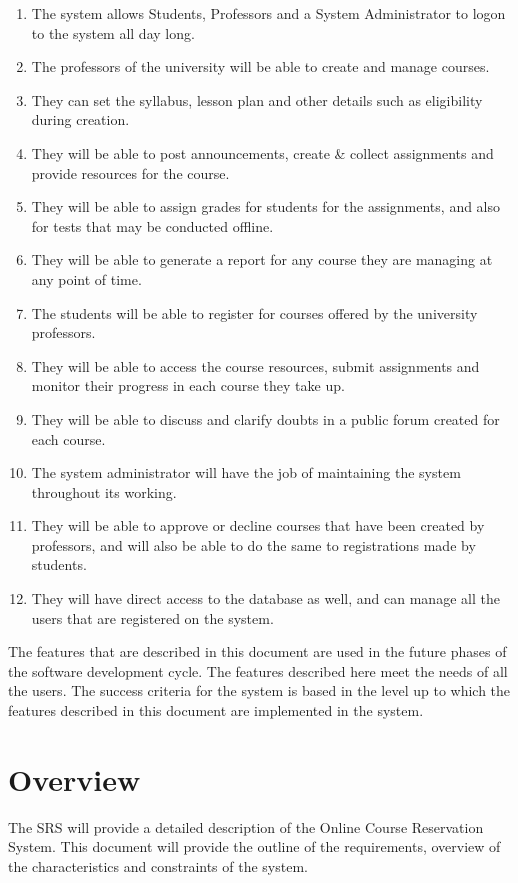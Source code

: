 \documentclass[12pt, a4]{report}
\begin{document}
\begin{enumerate}
    \item The system allows Students, Professors and a System Administrator to logon to the system all day long.
    \item The professors of the university will be able to create and manage courses.
    \item They can set the syllabus, lesson plan and other details such as eligibility during creation.
    \item They will be able to post announcements, create \& collect assignments and provide resources for the course.
    \item They will be able to assign grades for students for the assignments, and also for tests that may be conducted offline.
    \item They will be able to generate a report for any course they are managing at any point of time.
    \item The students will be able to register for courses offered by the university professors.
    \item They will be able to access the course resources, submit assignments and monitor their progress in each course they take up.
    \item They will be able to discuss and clarify doubts in a public forum created for each course.
    \item The system administrator will have the job of maintaining the system throughout its working.
    \item They will be able to approve or decline courses that have been created by professors, and will also be able to do the same to registrations made by students.
    \item They will have direct access to the database as well, and can manage all the users that are registered on the system.
\end{enumerate}

The features that are described in this document are used in the future phases of the software development cycle. The features described here meet the needs of all the users. The success criteria for the system is based in the level up to which the features described in this document are implemented in the system.


\section{Overview}
The SRS will provide a detailed description of the Online Course Reservation System. This document will provide the outline of the requirements, overview of the characteristics and constraints of the system.\\
\end{document}
